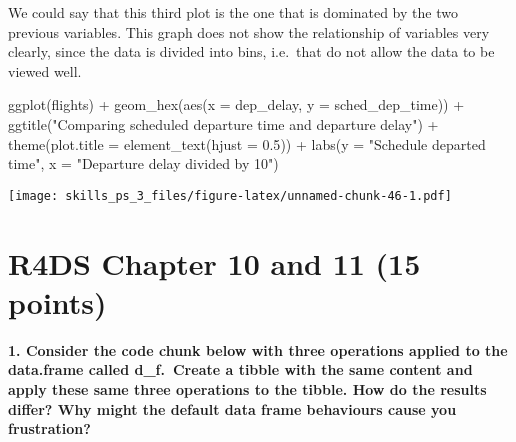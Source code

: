 \documentclass[
]{article}
\newenvironment{Shaded}{\begin{snugshade}}{\end{snugshade}}
\newcommand{\AttributeTok}[1]{\textcolor[rgb]{0.77,0.63,0.00}{#1}}
\newcommand{\DecValTok}[1]{\textcolor[rgb]{0.00,0.00,0.81}{#1}}
\newcommand{\FloatTok}[1]{\textcolor[rgb]{0.00,0.00,0.81}{#1}}
\newcommand{\FunctionTok}[1]{\textcolor[rgb]{0.00,0.00,0.00}{#1}}
\newcommand{\NormalTok}[1]{#1}
\newcommand{\OtherTok}[1]{\textcolor[rgb]{0.56,0.35,0.01}{#1}}
\newcommand{\SpecialCharTok}[1]{\textcolor[rgb]{0.00,0.00,0.00}{#1}}
\newcommand{\StringTok}[1]{\textcolor[rgb]{0.31,0.60,0.02}{#1}}
\begin{document}
We could say that this third plot is the one that is dominated by the
two previous variables. This graph does not show the relationship of
variables very clearly, since the data is divided into bins, i.e.~that
do not allow the data to be viewed well.

\begin{Shaded}
\begin{Highlighting}[]
\FunctionTok{ggplot}\NormalTok{(flights) }\SpecialCharTok{+} 
  \FunctionTok{geom\_hex}\NormalTok{(}\FunctionTok{aes}\NormalTok{(}\AttributeTok{x =}\NormalTok{ dep\_delay, }\AttributeTok{y =}\NormalTok{ sched\_dep\_time))  }\SpecialCharTok{+}
  \FunctionTok{ggtitle}\NormalTok{(}\StringTok{"Comparing scheduled departure time and departure delay"}\NormalTok{) }\SpecialCharTok{+}
  \FunctionTok{theme}\NormalTok{(}\AttributeTok{plot.title =} \FunctionTok{element\_text}\NormalTok{(}\AttributeTok{hjust =} \FloatTok{0.5}\NormalTok{))  }\SpecialCharTok{+}
  \FunctionTok{labs}\NormalTok{(}\AttributeTok{y =} \StringTok{"Schedule departed time"}\NormalTok{, }\AttributeTok{x =} \StringTok{"Departure delay divided by 10"}\NormalTok{)}
\end{Highlighting}
\end{Shaded}

\texttt{[image: skills\_ps\_3\_files/figure-latex/unnamed-chunk-46-1.pdf]}

\pagebreak

\hypertarget{r4ds-chapter-10-and-11-15-points}{%
\section{R4DS Chapter 10 and 11 (15
points)}\label{r4ds-chapter-10-and-11-15-points}}

\textbf{1. Consider the code chunk below with three operations applied
to the data.frame called d\_f.~Create a tibble with the same content and
apply these same three operations to the tibble. How do the results
differ? Why might the default data frame behaviours cause you
frustration?}

\begin{Shaded}
\end{Shaded}
\end{document}
